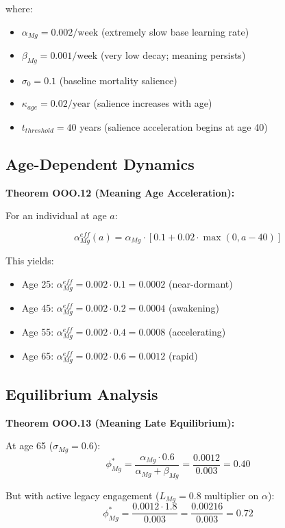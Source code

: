 where:
\begin{itemize}[nosep]
\item $\alpha_{Mg} = 0.002 / \text{week}$ (extremely slow base learning rate)
\item $\beta_{Mg} = 0.001 / \text{week}$ (very low decay; meaning persists)
\item $\sigma_0 = 0.1$ (baseline mortality salience)
\item $\kappa_{age} = 0.02 / \text{year}$ (salience increases with age)
\item $t_{threshold} = 40$ years (salience acceleration begins at age 40)
\end{itemize}

\subsection{Age-Dependent Dynamics}

\textbf{Theorem OOO.12 (Meaning Age Acceleration):}

For an individual at age $a$:

\begin{equation}
\alpha_{Mg}^{eff}(a) = \alpha_{Mg} \cdot [0.1 + 0.02 \cdot \max(0, a - 40)]
\end{equation}

This yields:
\begin{itemize}[nosep]
\item Age 25: $\alpha_{Mg}^{eff} = 0.002 \cdot 0.1 = 0.0002$ (near-dormant)
\item Age 45: $\alpha_{Mg}^{eff} = 0.002 \cdot 0.2 = 0.0004$ (awakening)
\item Age 55: $\alpha_{Mg}^{eff} = 0.002 \cdot 0.4 = 0.0008$ (accelerating)
\item Age 65: $\alpha_{Mg}^{eff} = 0.002 \cdot 0.6 = 0.0012$ (rapid)
\end{itemize}

\subsection{Equilibrium Analysis}

\textbf{Theorem OOO.13 (Meaning Late Equilibrium):}

At age 65 ($\sigma_{Mg} = 0.6$):
\begin{equation}
\phi^*_{Mg} = \frac{\alpha_{Mg} \cdot 0.6}{\alpha_{Mg} + \beta_{Mg}} = \frac{0.0012}{0.003} = 0.40
\end{equation}

But with active legacy engagement ($L_{Mg} = 0.8$ multiplier on $\alpha$):
\begin{equation}
\phi^*_{Mg} = \frac{0.0012 \cdot 1.8}{0.003} = \frac{0.00216}{0.003} = 0.72
\end{equation}

